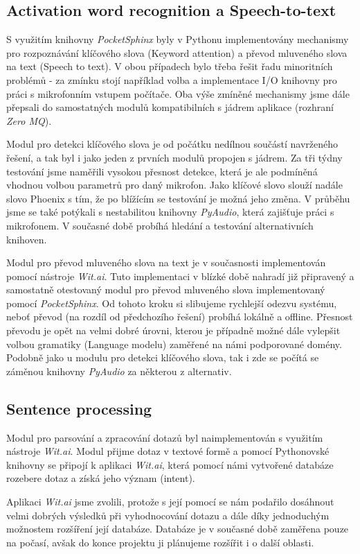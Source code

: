 \documentclass[12pt,a4paper]{article}
\begin{document}
\subsection{Activation word recognition a Speech-to-text}
S využitím knihovny \textit{PocketSphinx} byly v Pythonu implementovány mechanismy pro rozpoznávání klíčového slova (Keyword attention) a převod mluveného slova na text (Speech to text). V obou případech bylo třeba řešit řadu minoritních problémů - za zmínku stojí například volba a implementace I/O knihovny pro práci s mikrofonním vstupem počítače. Oba výše zmíněné mechanismy jsme dále přepsali do samostatných modulů kompatibilních s jádrem aplikace (rozhraní \textit{Zero MQ}).

Modul pro detekci klíčového slova je od počátku nedílnou součástí navrženého řešení, a tak byl i jako jeden z prvních modulů propojen s jádrem. Za tři týdny testování jsme naměřili vysokou přesnost detekce, která je ale podmíněná vhodnou volbou parametrů pro daný mikrofon. Jako klíčové slovo slouží nadále slovo Phoenix s tím, že po blížícím se testování je možná jeho změna. V průběhu jsme se také potýkali s nestabilitou knihovny \textit{PyAudio}, která zajišťuje práci s mikrofonem. V současné době probíhá hledání a testování alternativních knihoven.


Modul pro převod mluveného slova na text je v současnosti implementován pomocí nástroje \textit{Wit.ai}. Tuto implementaci v blízké době nahradí již připravený a samostatně otestovaný modul pro převod mluveného slova implementovaný pomocí \textit{PocketSphinx}. Od tohoto kroku si slibujeme rychlejší odezvu systému, neboť převod (na rozdíl od předchozího řešení) probíhá lokálně a offline. Přesnost převodu je opět na velmi dobré úrovni, kterou je případně možné dále vylepšit volbou gramatiky (Language modelu) zaměřené na námi podporované domény. Podobně jako u modulu pro detekci klíčového slova, tak i zde se počítá se záměnou knihovny \textit{PyAudio} za některou z alternativ.
\subsection{Sentence processing}
Modul pro parsování a zpracování dotazů byl naimplementován s využitím nástroje \textit{Wit.ai}. Modul přijme dotaz v textové formě a pomocí Pythonovské knihovny se připojí k aplikaci \textit{Wit.ai}, která pomocí námi vytvořené databáze rozebere dotaz a získá jeho význam (intent). 

Aplikaci \textit{Wit.ai} jsme zvolili, protože s její pomocí se nám podařilo dosáhnout velmi dobrých výsledků při vyhodnocování dotazu a dále díky jednoduchým možnostem rozšíření její databáze. Databáze je v současné době zaměřena pouze na počasí, avšak do konce projektu ji plánujeme rozšířit i o další oblasti.
\end{document}
